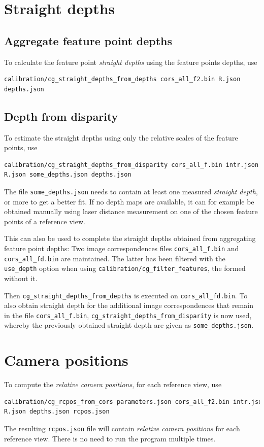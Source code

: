 \documentclass{scrreprt}
\begin{document}
\section{Straight depths}
\subsection{Aggregate feature point depths}
To calculate the feature point \emph{straight depths} using the feature points depths, use
\begin{lstlisting}[language=bash]
calibration/cg_straight_depths_from_depths cors_all_f2.bin R.json
depths.json
\end{lstlisting}

\subsection{Depth from disparity}
To estimate the straight depths using only the relative scales of the feature points, use
\begin{lstlisting}[language=bash]
calibration/cg_straight_depths_from_disparity cors_all_f.bin intr.json
R.json some_depths.json depths.json
\end{lstlisting}
The file \texttt{some\_depths.json} needs to contain at least one measured \emph{straight depth}, or more to get a better fit. If no depth maps are available, it can for example be obtained manually using laser distance measurement on one of the chosen feature points of a reference view.

This can also be used to complete the straight depths obtained from aggregating feature point depths: Two image correspondences files \texttt{cors\_all\_f.bin} and \texttt{cors\_all\_fd.bin} are maintained. The latter has been filtered with the \texttt{use\_depth} option when using \texttt{calibration/cg\_filter\_features}, the formed without it. 

Then \texttt{cg\_straight\_depths\_from\_depths} is executed on \texttt{cors\_all\_fd.bin}. To also obtain straight depth for the additional image correspondences that remain in the file \texttt{cors\_all\_f.bin}, \texttt{cg\_straight\_depths\_from\_disparity} is now used, whereby the previously obtained straight depth are given as \texttt{some\_depths.json}. 



\section{Camera positions}
To compute the \emph{relative camera positions}, for each reference view, use
\begin{lstlisting}[language=bash]
calibration/cg_rcpos_from_cors parameters.json cors_all_f2.bin intr.json
R.json depths.json rcpos.json
\end{lstlisting}
The resulting \texttt{rcpos.json} file will contain \emph{relative camera positions} for each reference view. There is no need to run the program multiple times.
\end{document}
